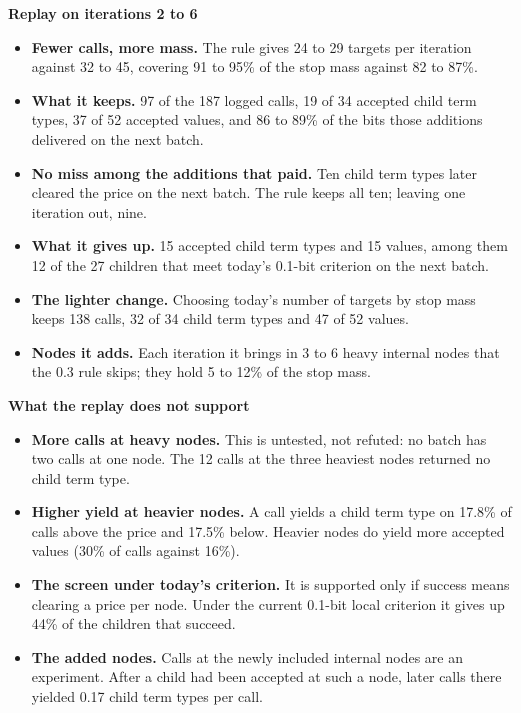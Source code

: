 \documentclass[10pt,a4paper]{article}
\newcommand{\lab}[1]{\par\vspace{0.35em}\textbf{#1}\par\nobreak}
\begin{document}
\lab{Replay on iterations 2 to 6}
\begin{itemize}
\item \textbf{Fewer calls, more mass.} The rule gives 24 to 29 targets per iteration against 32 to 45, covering 91 to 95\% of the stop mass against 82 to 87\%.
\item \textbf{What it keeps.} 97 of the 187 logged calls, 19 of 34 accepted child term types, 37 of 52 accepted values, and 86 to 89\% of the bits those additions delivered on the next batch.
\item \textbf{No miss among the additions that paid.} Ten child term types later cleared the price on the next batch. The rule keeps all ten; leaving one iteration out, nine.
\item \textbf{What it gives up.} 15 accepted child term types and 15 values, among them 12 of the 27 children that meet today's 0.1-bit criterion on the next batch.
\item \textbf{The lighter change.} Choosing today's number of targets by stop mass keeps 138 calls, 32 of 34 child term types and 47 of 52 values.
\item \textbf{Nodes it adds.} Each iteration it brings in 3 to 6 heavy internal nodes that the 0.3 rule skips; they hold 5 to 12\% of the stop mass.
\end{itemize}

\lab{What the replay does not support}
\begin{itemize}
\item \textbf{More calls at heavy nodes.} This is untested, not refuted: no batch has two calls at one node. The 12 calls at the three heaviest nodes returned no child term type.
\item \textbf{Higher yield at heavier nodes.} A call yields a child term type on 17.8\% of calls above the price and 17.5\% below. Heavier nodes do yield more accepted values (30\% of calls against 16\%).
\item \textbf{The screen under today's criterion.} It is supported only if success means clearing a price per node. Under the current 0.1-bit local criterion it gives up 44\% of the children that succeed.
\item \textbf{The added nodes.} Calls at the newly included internal nodes are an experiment. After a child had been accepted at such a node, later calls there yielded 0.17 child term types per call.
\end{itemize}
\end{document}
